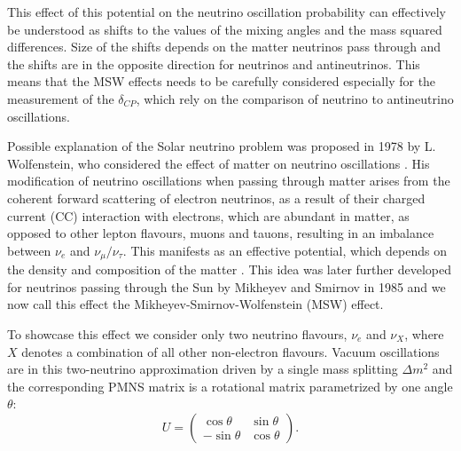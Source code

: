 This effect of this potential on the neutrino oscillation probability can effectively be understood as shifts to the values of the mixing angles and the mass squared differences. Size of the shifts depends on the matter neutrinos pass through and the shifts are in the opposite direction for neutrinos and antineutrinos. This means that the \gls{MSW} effects needs to be carefully considered especially for the measurement of the $\delta_{CP}$, which rely on the comparison of neutrino to antineutrino oscillations.
\fi


\iffalse
Possible explanation of the Solar neutrino problem was proposed in 1978 by L. Wolfenstein, who considered the effect of matter on neutrino oscillations \cite{Wolfenstein78.pdf}. His modification of neutrino oscillations when passing through matter arises from the coherent forward scattering of electron neutrinos, as a result of their charged current (CC) interaction with electrons, which are abundant in matter, as opposed to other lepton flavours, muons and tauons, resulting in an imbalance between $\nu_e$ and $\nu_{\mu}/\nu_{\tau}$. This manifests as an effective potential, which depends on the density and composition of the matter \cite{Wolfenstein78.pdf}. This idea was later further developed for neutrinos passing through the Sun by Mikheyev and Smirnov in 1985 \cite{MikheyevSmirnov85.pdf}\cite{Gonzalez-GarciaNuMassesAndMixing.pdf} and we now call this effect the Mikheyev-Smirnov-Wolfenstein (MSW) effect.

To showcase this effect we consider only two neutrino flavours, $\nu_e$ and $\nu_X$, where $X$ denotes a combination of all other non-electron flavours. Vacuum oscillations are in this two-neutrino approximation driven by a single mass splitting $\Delta m^2$ and the corresponding PMNS matrix is a rotational matrix parametrized by one angle $\theta$:
\begin{equation}
U=
\begin{pmatrix}
 \cos\theta  & \sin\theta    \\
 -\sin\theta & \cos\theta
\end{pmatrix}.
\end{equation}

